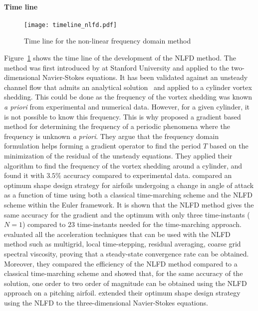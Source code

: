 \paragraph{Time line}
\begin{figure}[htbp]
  \centering
  \texttt{[image: timeline\_nlfd.pdf]}
  \caption{Time line for the non-linear frequency domain method}
  \label{fig:timeline_nlfd}
\end{figure}
Figure~\ref{fig:timeline_nlfd} shows the time line of the
development of the NLFD method.
The method was first introduced by \citet{McMullen2001}
at Stanford University and applied to the two-dimensional
Navier-Stokes equations. It has been validated against an
unsteady channel flow that admits an analytical 
solution~\cite{Merkle1987} and applied to a cylinder
vortex shedding. This could be done as the frequency of the
vortex shedding was known \emph{a priori} from experimental
and numerical data. However, for a given cylinder, it is not
possible to know this frequency. This is why
 \citet{McMullen2002, McMullen2006a}
proposed a gradient based method for determining the frequency
of a periodic phenomena where the frequency is unknown
\emph{a priori}. They argue that the frequency domain formulation
helps forming a gradient operator to find the period $T$ based
on the minimization of the residual of the unsteady equations.
They applied their algorithm to find the frequency of the vortex
shedding around a cylinder, and found it with $3.5\%$ accuracy
compared to experimental data.
\citet{Nadarajah2003} compared an optimum shape design 
strategy for 
airfoils undergoing a change 
in angle of attack as a function of time 
using both a classical time-marching scheme
and the NLFD scheme within the Euler
framework. It is shown that the NLFD method
gives the same accuracy for the gradient and the optimum with only 
three time-instants ($N=1$)
compared to $23$ time-instants needed for 
the time-marching approach.
\citet{McMullen2006} evaluated all the acceleration techniques
that can be used with the NLFD method such as multigrid, local
time-stepping, residual averaging, coarse grid spectral viscosity,
proving that a steady-state convergence rate can be obtained.
Moreover, they compared the efficiency of the
NLFD method compared to a classical time-marching
scheme and showed that, for the same accuracy of the
solution, one order to two order of magnitude can
be obtained using the NLFD approach on a pitching airfoil.
\citet{Nadarajah2007} extended their optimum shape design strategy
using the NLFD to the three-dimensional Navier-Stokes equations.

